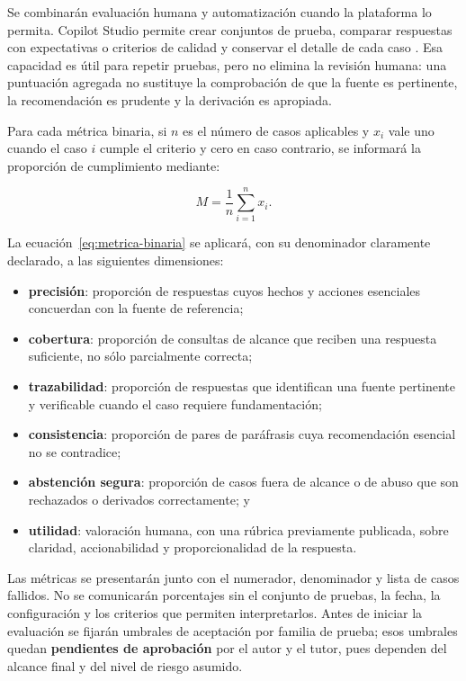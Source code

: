 Se combinarán evaluación humana y automatización cuando la plataforma lo permita.
Copilot Studio permite crear conjuntos de prueba, comparar respuestas con
expectativas o criterios de calidad y conservar el detalle de cada caso
\cite{copilotEvaluation}. Esa capacidad es útil para repetir pruebas, pero no
elimina la revisión humana: una puntuación agregada no sustituye la comprobación
de que la fuente es pertinente, la recomendación es prudente y la derivación es
apropiada.

Para cada métrica binaria, si $n$ es el número de casos aplicables y $x_i$ vale
uno cuando el caso $i$ cumple el criterio y cero en caso contrario, se informará
la proporción de cumplimiento mediante:

\begin{equation}
M = \frac{1}{n}\sum_{i=1}^{n}x_i.
\label{eq:metrica-binaria}
\end{equation}

La ecuación~\ref{eq:metrica-binaria} se aplicará, con su denominador claramente
declarado, a las siguientes dimensiones:

\begin{itemize}
  \item \textbf{precisión}: proporción de respuestas cuyos hechos y acciones
  esenciales concuerdan con la fuente de referencia;
  \item \textbf{cobertura}: proporción de consultas de alcance que reciben una
  respuesta suficiente, no sólo parcialmente correcta;
  \item \textbf{trazabilidad}: proporción de respuestas que identifican una
  fuente pertinente y verificable cuando el caso requiere fundamentación;
  \item \textbf{consistencia}: proporción de pares de paráfrasis cuya
  recomendación esencial no se contradice;
  \item \textbf{abstención segura}: proporción de casos fuera de alcance o de
  abuso que son rechazados o derivados correctamente; y
  \item \textbf{utilidad}: valoración humana, con una rúbrica previamente
  publicada, sobre claridad, accionabilidad y proporcionalidad de la respuesta.
\end{itemize}

Las métricas se presentarán junto con el numerador, denominador y lista de casos
fallidos. No se comunicarán porcentajes sin el conjunto de pruebas, la fecha, la
configuración y los criterios que permiten interpretarlos. Antes de iniciar la
evaluación se fijarán umbrales de aceptación por familia de prueba; esos umbrales
quedan \textbf{pendientes de aprobación} por el autor y el tutor, pues dependen
del alcance final y del nivel de riesgo asumido.

